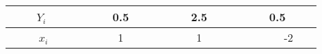 \begin{tabular}{|c|c|c|c|} 
        \hline
       \ \ \ \ $Y_i$ \ \ \ \ &\ \ \ \ 0.5\ \ \ \ &\ \ \ \ 2.5\ \ \ \ &\ \ \ \ 0.5\ \ \ \ \\
        \hline
       \ \ \ \ $x_i$\ \ \ \  &\ \ \ \ 1\ \ \ \ &\ \ \ \ 1\ \ \ \ &\ \ \ \ -2 \\
        \hline
       
    \end{tabular}